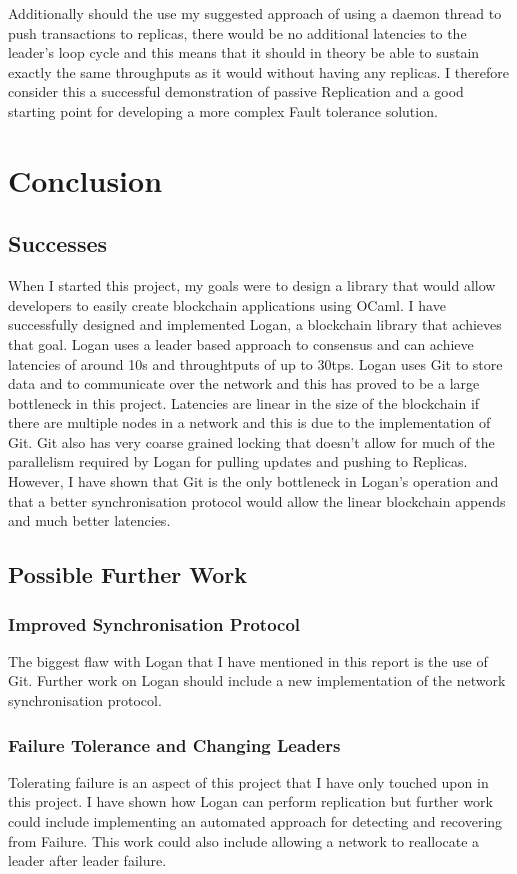 \documentclass[12pt,a4paper,twoside,openright]{report}
\begin{document}
	Additionally should the use my suggested approach of using a daemon thread to push transactions to replicas, there would be no additional latencies to the leader's loop cycle and this means that it should in theory be able to sustain exactly the same throughputs as it would without having any replicas.
	I therefore consider this a successful demonstration of passive Replication and a good starting point for developing a more complex Fault tolerance solution.

	\chapter{Conclusion}
	\section{Successes}
	When I started this project, my goals were to design a library that would allow developers to easily create blockchain applications using OCaml.
	I have successfully designed and implemented Logan, a blockchain library that achieves that goal.
	Logan uses a leader based approach to consensus and can achieve latencies of around 10s and throughtputs of up to 30tps.
	Logan uses Git to store data and to communicate over the network and this has proved to be a large bottleneck in this project. 
	Latencies are linear in the size of the blockchain if there are multiple nodes in a network and this is due to the implementation of Git.
	Git also has very coarse grained locking that doesn't allow for much of the parallelism required by Logan for pulling updates and pushing to Replicas.
	However, I have shown that Git is the only bottleneck in Logan's operation and that a better synchronisation protocol would allow the linear blockchain appends and much better latencies. 

	\section{Possible Further Work}
	\subsection{Improved Synchronisation Protocol}
	The biggest flaw with Logan that I have mentioned in this report is the use of Git.
	Further work on Logan should include a new implementation of the network synchronisation protocol.
	\subsection{Failure Tolerance and Changing Leaders}
	Tolerating failure is an aspect of this project that I have only touched upon in this project. 
	I have shown how Logan can perform replication but further work could include implementing an automated approach for detecting and recovering from Failure. 
	This work could also include allowing a network to reallocate a leader after leader failure.
\end{document}
